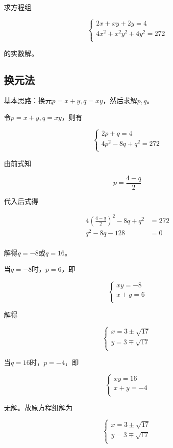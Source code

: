 

求方程组

\[ \begin{cases}
  2x + xy + 2y = 4 \\
  4x^2 + x^2y^2 + 4y^2 = 272 \\
\end{cases} \]

的实数解。


\subsection{换元法}

基本思路：换元$p = x + y, q = xy$，然后求解$p, q$。

令$p = x + y, q = xy$，则有

\[ \begin{cases}
  2p + q = 4 \\
  4p^2 - 8q + q^2 = 272 \\
\end{cases} \]

由前式知

\[ p = \frac{4 - q}2 \]

代入后式得

\begin{align*}
  4\left(\frac{4 - q}2\right)^2 - 8q + q^2 &= 272 \\
  q^2 - 8q - 128 &= 0 \\
\end{align*}

解得$q = -8$或$q = 16$。

当$q = -8$时，$p = 6$，即

\[ \begin{cases}
  xy = -8 \\
  x + y = 6 \\
\end{cases} \]

解得

\[ \begin{cases}
  x = 3\pm\sqrt{17} \\
  y = 3\mp\sqrt{17} \\
\end{cases} \]

当$q = 16$时，$p = -4$，即

\[ \begin{cases}
  xy = 16 \\
  x + y = -4 \\
\end{cases} \]

无解。故原方程组解为

\[ \begin{cases}
  x = 3\pm\sqrt{17} \\
  y = 3\mp\sqrt{17} \\
\end{cases} \]

